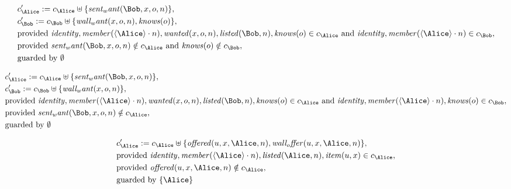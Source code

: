 \begin{align*}
&
c'_
{
\Alice
}
 := 
c_
{
\Alice
}
 \uplus 
\{
\mathit{
sent_want
}
(
\Bob
,
x
,
o
,
n
)
\}
,\\
&
c'_
{
\Bob
}
 := 
c_
{
\Bob
}
 \uplus 
\{
\mathit{
wall_want
}
(
x
,
o
,
n
)
,
\mathit{
knows
}
(
o
)
\}
,\\
&
\text{provided } 
\mathit{
identity
}
,
\mathit{
member
}
(
\langle
\Alice
\rangle
\cdot
n
)
,
\mathit{
wanted
}
(
x
,
o
,
n
)
,
\mathit{
listed
}
(
\Bob
,
n
)
,
\mathit{
knows
}
(
o
)
 \in c_
{
\Alice
}
 \text{ and } 
\mathit{
identity
}
,
\mathit{
member
}
(
\langle
\Alice
\rangle
\cdot
n
)
 \in c_
{
\Bob
}
,\\
&
\text{provided } 
\mathit{
sent_want
}
(
\Bob
,
x
,
o
,
n
)
 \notin c_
{
\Alice
}
 \text{ and } 
\mathit{
knows
}
(
o
)
 \notin c_
{
\Bob
}
,\\
&
\text{guarded by } \emptyset
\end{align*}

\begin{align*}
&
c'_
{
\Alice
}
 := 
c_
{
\Alice
}
 \uplus 
\{
\mathit{
sent_want
}
(
\Bob
,
x
,
o
,
n
)
\}
,\\
&
c'_
{
\Bob
}
 := 
c_
{
\Bob
}
 \uplus 
\{
\mathit{
wall_want
}
(
x
,
o
,
n
)
\}
,\\
&
\text{provided } 
\mathit{
identity
}
,
\mathit{
member
}
(
\langle
\Alice
\rangle
\cdot
n
)
,
\mathit{
wanted
}
(
x
,
o
,
n
)
,
\mathit{
listed
}
(
\Bob
,
n
)
,
\mathit{
knows
}
(
o
)
 \in c_
{
\Alice
}
 \text{ and } 
\mathit{
identity
}
,
\mathit{
member
}
(
\langle
\Alice
\rangle
\cdot
n
)
,
\mathit{
knows
}
(
o
)
 \in c_
{
\Bob
}
,\\
&
\text{provided } 
\mathit{
sent_want
}
(
\Bob
,
x
,
o
,
n
)
 \notin c_
{
\Alice
}
,\\
&
\text{guarded by } \emptyset
\end{align*}

\begin{align*}
&
c'_
{
\Alice
}
 := 
c_
{
\Alice
}
 \uplus 
\{
\mathit{
offered
}
(
u
,
x
,
\Alice
,
n
)
,
\mathit{
wall_offer
}
(
u
,
x
,
\Alice
,
n
)
\}
,\\
&
\text{provided } 
\mathit{
identity
}
,
\mathit{
member
}
(
\langle
\Alice
\rangle
\cdot
n
)
,
\mathit{
listed
}
(
\Alice
,
n
)
,
\mathit{
item
}
(
u
,
x
)
 \in c_
{
\Alice
}
,\\
&
\text{provided } 
\mathit{
offered
}
(
u
,
x
,
\Alice
,
n
)
 \notin c_
{
\Alice
}
,\\
&
\text{guarded by } \{
\Alice
\}
\end{align*}
